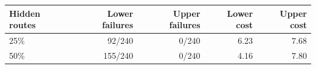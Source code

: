 \begin{tabular}{lrrrr}
\hline
Hidden routes & Lower failures & Upper failures & Lower cost & Upper cost \\
\hline
25\% & 92/240 & 0/240 & 6.23 & 7.68 \\
50\% & 155/240 & 0/240 & 4.16 & 7.80 \\
\hline
\end{tabular}
